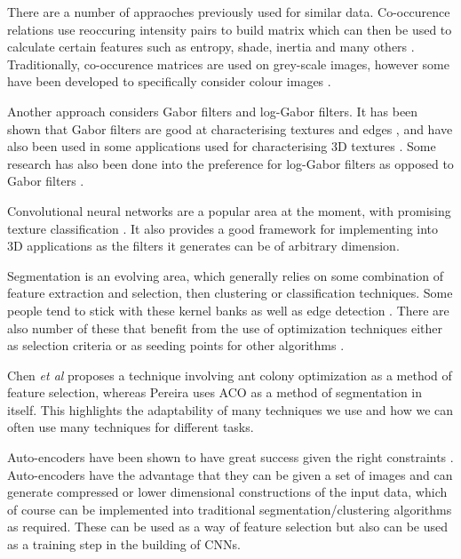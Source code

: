 \documentclass[11pt, a4paper]{article}
\begin{document}
There are a number of appraoches previously used for similar data. Co-occurence relations use reoccuring intensity pairs to build matrix which can then be used to calculate certain features such as entropy, shade, inertia and many others \cite{longstaff1995improving}. Traditionally, co-occurence matrices are used on grey-scale images, however some have been developed to specifically consider colour images \cite{palm2004color}.

Another approach considers Gabor filters and log-Gabor filters. It has been shown that Gabor filters are good at characterising textures and edges \cite{idrissa2002texture}, and have also been used in some applications used for characterising 3D textures \cite{xu2009automatic}. Some research has also been done into the preference for log-Gabor filters as opposed to Gabor filters \cite{nava2011comparison}.

Convolutional neural networks are a popular area at the moment, with promising texture classification \cite{cimpoi2015deep}. It also provides a good framework for implementing into 3D applications as the filters it generates can be of arbitrary dimension.

Segmentation is an evolving area, which generally relies on some combination of feature extraction and selection, then clustering or classification techniques. Some people tend to stick with these kernel banks \cite{sardar2020efficient} as well as edge detection \cite{sujatha2015performance}. There are also number of these that benefit from the use of optimization techniques either as selection criteria \cite{chen2013efficient} or as seeding points for other algorithms \cite{saug2015color}.

Chen \textit{et al} \cite{chen2013efficient} proposes a technique involving ant colony optimization as a method of feature selection, whereas Pereira \cite{pereira2015exudate} uses ACO as a method of segmentation in itself. This highlights the adaptability of many techniques we use and how we can often use many techniques for different tasks.

Auto-encoders have been shown to have great success given the right constraints \cite{wang2017feature}. Auto-encoders have the advantage that they can be given a set of images and can generate compressed or lower dimensional constructions of the input data, which of course can be implemented into traditional segmentation/clustering algorithms as required. These can be used as a way of feature selection but also can be used as a training step in the building of CNNs.
\end{document}
